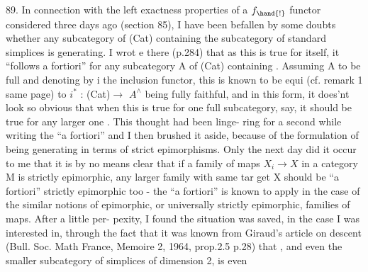 89. In connection with the left exactness properties of a $f_{\hand{!}}$ functor\hand{,}
considered three days ago (section 85), I have been befallen by some
doubts whether any subcategory of (Cat) containing the subcategory
of standard simplices is  generating. I wrot e there (p.284) that as
this is true for \hand{$\Delta$} itself, it ``follows a fortiori'' for any subcategory
A of (Cat) containing \hand{$\Delta$}. Assuming A to be full and denoting by i the
inclusion functor, this is known to be equi (cf. remark 1 same page)
to $i^{*}$ : (Cat)$\longrightarrow$ $A^{\wedge}$ being fully faithful, and in this form, it does'nt
look so obvious that when this is true for one full subcategory,  say,
it should be true for any larger one . This thought had  been linge-%
ring for a second while writing the ``a fortiori'' and I then brushed it
aside, because of the formulation of being generating in terms of strict
epimorphisms. Only the next day did it occur to me that it is by no
means clear that if a family of maps $X_i \longrightarrow X$ in a category M is
strictly epimorphic, any larger family with same tar get X should be ``a
fortiori'' strictly epimorphic too - the ``a fortiori'' is known to apply
 in the case of  the similar notions of epimorphic, or
universally strictly epimorphic, families of maps. After a little per-%
pexity, I found the situation was saved, in the case I was interested
in, through the fact that it was known from Giraud's article on descent
(Bull. Soc. Math France, Memoire 2, 1964, prop.2.5 p.28) that \hand{$\Delta$},
and even the smaller subcategory of simplices of dimension \hand{$\leqslant$} 2, is even

